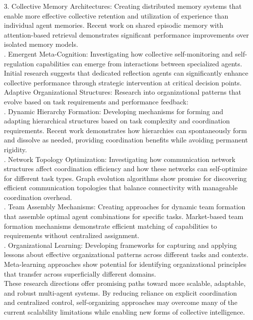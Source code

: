 3. Collective Memory Architectures: Creating distributed memory systems that enable more effective collective retention and utilization of experience than individual agent memories. Recent work on shared episodic memory with attention-based retrieval demonstrates significant performance improvements over isolated memory models.\\ . Emergent Meta-Cognition: Investigating how collective self-monitoring and self-regulation capabilities can emerge from interactions between specialized agents. Initial research suggests that dedicated reflection agents can significantly enhance collective performance through strategic intervention at critical decision points.\\ \newline
Adaptive Organizational Structures: Research into organizational patterns that evolve based on task requirements and performance feedback:\\ . Dynamic Hierarchy Formation: Developing mechanisms for forming and adapting hierarchical structures based on task complexity and coordination requirements. Recent work demonstrates how hierarchies can spontaneously form and dissolve as needed, providing coordination benefits while avoiding permanent rigidity.\\ . Network Topology Optimization: Investigating how communication network structures affect coordination efficiency and how these networks can self-optimize for different task types. Graph evolution algorithms show promise for discovering efficient communication topologies that balance connectivity with manageable coordination overhead.\\ . Team Assembly Mechanisms: Creating approaches for dynamic team formation that assemble optimal agent combinations for specific tasks. Market-based team formation mechanisms demonstrate efficient matching of capabilities to requirements without centralized assignment.\\ . Organizational Learning: Developing frameworks for capturing and applying lessons about effective organizational patterns across different tasks and contexts. Meta-learning approaches show potential for identifying organizational principles that transfer across superficially different domains.\\ \newline
These research directions offer promising paths toward more scalable, adaptable, and robust multi-agent systems. By reducing reliance on explicit coordination and centralized control, self-organizing approaches may overcome many of the current scalability limitations while enabling new forms of collective intelligence.\\
